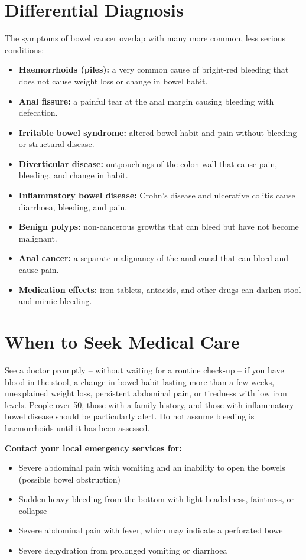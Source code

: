 \section*{Differential Diagnosis}
The symptoms of bowel cancer overlap with many more common, less serious conditions:
\begin{itemize}
    \item \textbf{Haemorrhoids (piles):} a very common cause of bright-red bleeding that does not cause weight loss or change in bowel habit.
    \item \textbf{Anal fissure:} a painful tear at the anal margin causing bleeding with defecation.
    \item \textbf{Irritable bowel syndrome:} altered bowel habit and pain without bleeding or structural disease.
    \item \textbf{Diverticular disease:} outpouchings of the colon wall that cause pain, bleeding, and change in habit.
    \item \textbf{Inflammatory bowel disease:} Crohn's disease and ulcerative colitis cause diarrhoea, bleeding, and pain.
    \item \textbf{Benign polyps:} non-cancerous growths that can bleed but have not become malignant.
    \item \textbf{Anal cancer:} a separate malignancy of the anal canal that can bleed and cause pain.
    \item \textbf{Medication effects:} iron tablets, antacids, and other drugs can darken stool and mimic bleeding.
\end{itemize}

\section*{When to Seek Medical Care}
See a doctor promptly -- without waiting for a routine check-up -- if you have blood in the stool, a change in bowel habit lasting more than a few weeks, unexplained weight loss, persistent abdominal pain, or tiredness with low iron levels. People over 50, those with a family history, and those with inflammatory bowel disease should be particularly alert. Do not assume bleeding is haemorrhoids until it has been assessed.

\textbf{Contact your local emergency services for:}
\begin{itemize}
    \item Severe abdominal pain with vomiting and an inability to open the bowels (possible bowel obstruction)
    \item Sudden heavy bleeding from the bottom with light-headedness, faintness, or collapse
    \item Severe abdominal pain with fever, which may indicate a perforated bowel
    \item Severe dehydration from prolonged vomiting or diarrhoea
\end{itemize}

